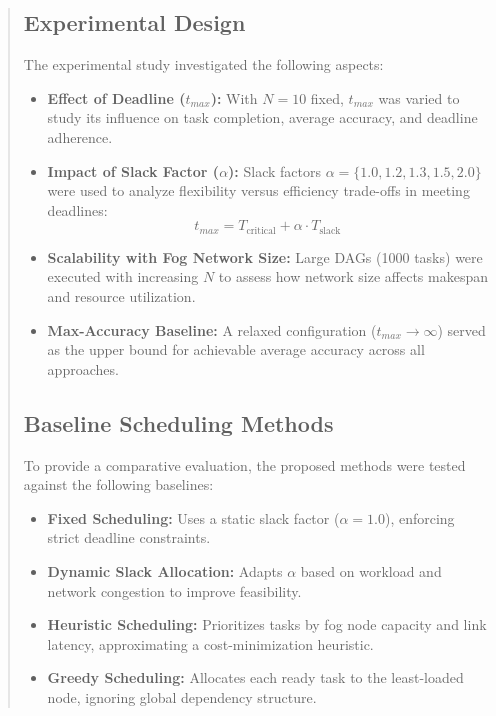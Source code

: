 \documentclass[conference]{IEEEtran}
\begin{document}
\begin{abstract}
\subsection{Experimental Design}

The experimental study investigated the following aspects:

\begin{itemize}
    \item \textbf{Effect of Deadline ($t_{max}$):}  
    With $N=10$ fixed, $t_{max}$ was varied to study its influence on task completion, average accuracy, and deadline adherence.

    \item \textbf{Impact of Slack Factor ($\alpha$):}  
    Slack factors $\alpha = \{1.0, 1.2, 1.3, 1.5, 2.0\}$ were used to analyze flexibility versus efficiency trade-offs in meeting deadlines:
    \[
    t_{max} = T_{\text{critical}} + \alpha \cdot T_{\text{slack}}
    \]

    \item \textbf{Scalability with Fog Network Size:}  
    Large DAGs (1000 tasks) were executed with increasing $N$ to assess how network size affects makespan and resource utilization.

    \item \textbf{Max-Accuracy Baseline:}  
    A relaxed configuration ($t_{max} \to \infty$) served as the upper bound for achievable average accuracy across all approaches.
\end{itemize}

\subsection{Baseline Scheduling Methods}

To provide a comparative evaluation, the proposed methods were tested against the following baselines:

\begin{itemize}
    \item \textbf{Fixed Scheduling:}  
    Uses a static slack factor ($\alpha = 1.0$), enforcing strict deadline constraints.
    \item \textbf{Dynamic Slack Allocation:}  
    Adapts $\alpha$ based on workload and network congestion to improve feasibility.
    \item \textbf{Heuristic Scheduling:}  
    Prioritizes tasks by fog node capacity and link latency, approximating a cost-minimization heuristic.
    \item \textbf{Greedy Scheduling:}  
    Allocates each ready task to the least-loaded node, ignoring global dependency structure.
\end{itemize}


\end{abstract}
\end{document}
